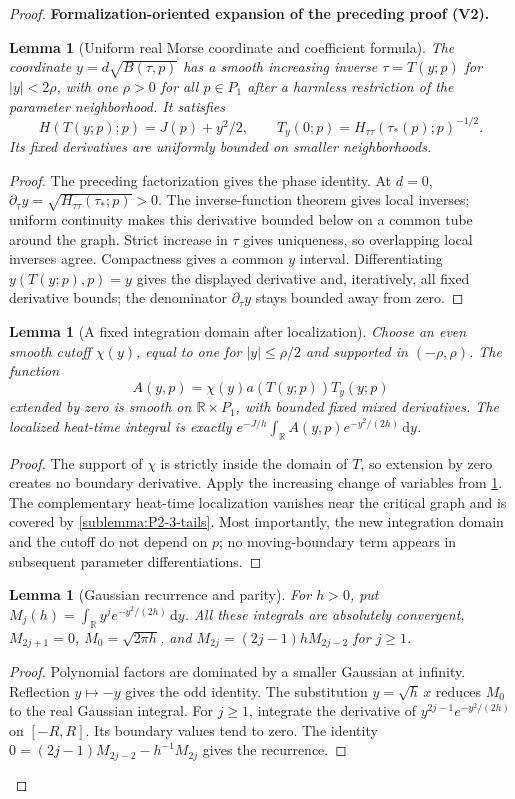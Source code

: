 \documentclass[11pt]{article}
\newtheorem{lemma}[theorem]{Lemma}
\newcommand{\formalisationparentid}{X}
\newenvironment{formalisationaddition}[1]{\par\medskip\begingroup\color{blue}\def\formalisationparentid{#1}\setcounter{formalizationsublemma}{0}\let\lemma\formalizationsublemma\let\endlemma\endformalizationsublemma
  \def\Eo{\mathcal E_h^\circ}\def\EE{\mathcal E_h}\def\phio{\phi_h^\circ}\def\phih{\phi_h}\def\Ho{H_h^{\rm atom}(v^\circ)}\def\Ha{H_h^{\rm atom}}\def\HL{H_h^{L}}\def\Dh{D_h}\def\Log{\operatorname{Log}}\def\ellh{\ell_h}\def\Gp{G_{p,h}}\def\Ast{A_{*,h}}\def\ahat{\widehat{\mathfrak a}_h}\def\ah{\mathfrak a_h}\def\rh{\widehat\rho_h}\def\deltah{\widehat\delta_h}\def\oldref##1{\textup{(##1)}}\def\interface##1{\par\noindent\textit{Analytical interface used here.} ##1\par}\def\finish{\par\noindent\textit{Conclusion of the formalization-oriented expansion.} }\par\noindent\textbf{Formalization-oriented expansion of the preceding proof (V2).}\par\smallskip
}{\par\endgroup\medskip
}
\newcommand{\R}{\mathbb R}
\begin{document}
\begin{proof}
\begin{formalisationaddition}{P2.3}
\begin{lemma}[Uniform real Morse coordinate and coefficient formula]\label{sublemma:P2-3-morse}
The coordinate $y=d\sqrt{B(\tau,p)}$ has a smooth increasing inverse
$\tau=T(y;p)$ for $|y|<2\rho$, with one $\rho>0$ for all $p\in P_1$
after a harmless restriction of the parameter neighborhood. It satisfies
\[
 H(T(y;p);p)=J(p)+y^2/2,\qquad
 T_y(0;p)=H_{\tau\tau}(\tau_*(p);p)^{-1/2}.
\]
Its fixed derivatives are uniformly bounded on smaller neighborhoods.
\end{lemma}
\begin{proof}
The preceding factorization gives the phase identity. At $d=0$,
$\partial_\tau y=\sqrt{H_{\tau\tau}(\tau_*;p)}>0$.
The inverse-function theorem gives local inverses; uniform continuity
makes this derivative bounded below on a common tube around the graph.
Strict increase in $\tau$ gives uniqueness, so overlapping local inverses
agree. Compactness gives a common $y$ interval. Differentiating
$y(T(y;p),p)=y$ gives the displayed derivative and, iteratively, all fixed
derivative bounds; the denominator $\partial_\tau y$ stays bounded away
from zero.
\end{proof}

\begin{lemma}[A fixed integration domain after localization]\label{sublemma:P2-3-fixed-amplitude}
Choose an even smooth cutoff $\chi(y)$, equal to one for $|y|\le\rho/2$
and supported in $(-\rho,\rho)$. The function
\[
 A(y,p)=\chi(y)a(T(y;p))T_y(y;p)
\]
extended by zero is smooth on $\R\times P_1$, with bounded fixed mixed
derivatives. The localized heat-time integral is exactly
$e^{-J/h}\int_\R A(y,p)e^{-y^2/(2h)}\,\mathrm dy$.
\end{lemma}
\begin{proof}
The support of $\chi$ is strictly inside the domain of $T$, so extension
by zero creates no boundary derivative. Apply the increasing change of
variables from \ref{sublemma:P2-3-morse}. The complementary heat-time
localization vanishes near the critical graph and is covered by
\ref{sublemma:P2-3-tails}. Most importantly, the new integration domain
and the cutoff do not depend on $p$; no moving-boundary term appears in
subsequent parameter differentiations.
\end{proof}

\begin{lemma}[Gaussian recurrence and parity]\label{sublemma:P2-3-moment-recurrence}
For $h>0$, put $M_j(h)=\int_\R y^je^{-y^2/(2h)}\,\mathrm dy$.
All these integrals are absolutely convergent,
$M_{2j+1}=0$, $M_0=\sqrt{2\pi h}$, and
$M_{2j}=(2j-1)hM_{2j-2}$ for $j\ge1$.
\end{lemma}
\begin{proof}
Polynomial factors are dominated by a smaller Gaussian at infinity.
Reflection $y\mapsto-y$ gives the odd identity. The substitution
$y=\sqrt h\,x$ reduces $M_0$ to the real Gaussian integral.
For $j\ge1$, integrate the derivative of
$y^{2j-1}e^{-y^2/(2h)}$ on $[-R,R]$. Its boundary values tend to zero.
The identity
$0=(2j-1)M_{2j-2}-h^{-1}M_{2j}$ gives the recurrence.
\end{proof}


\end{formalisationaddition}
\end{proof}
\end{document}
